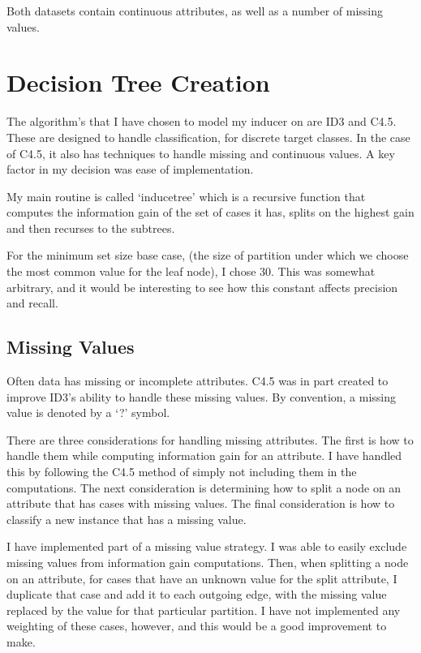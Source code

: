 \documentclass[letterpaper]{article}
\begin{document}
Both datasets contain continuous attributes, as well as a number of missing values.

\section{Decision Tree Creation}
The algorithm's that I have chosen to model my inducer on
are ID3 and C4.5. These are designed to handle classification, for
discrete target classes. In the case of C4.5, it also has techniques
to handle missing and continuous values. A key factor in my decision
was ease of implementation.

My main routine is called `inducetree' which is a recursive function
that computes the information gain of the set of cases it has, splits
on the highest gain and then recurses to the subtrees.

For the minimum set size base case, (the size of partition under 
which we choose the most common value for the leaf node), I chose 30.
This was somewhat arbitrary, and it would be interesting to see how this constant
affects precision and recall.

\subsection{Missing Values}
Often data has missing or incomplete attributes. C4.5 was in part created to 
improve ID3's ability to handle these missing values. By convention,
a missing value is denoted by a `?' symbol.

There are three considerations for handling missing attributes. 
The first is how to handle them while computing information gain for 
an attribute. I have handled this by following the C4.5 method of simply 
not including them in the computations. The next consideration is determining 
how to split a node on an attribute that has cases with missing values. 
The final consideration is how to classify a new instance that 
has a missing value.

I have implemented part of a missing value strategy. I was able to
easily exclude missing values from information gain computations. 
Then, when splitting a node on an attribute, for cases that have an
unknown value for the split attribute, I duplicate that case and add
it to each outgoing edge, with the missing value replaced by the
value for that particular partition. I have not implemented any
weighting of these cases, however, and this would be a good improvement
to make.
\end{document}
